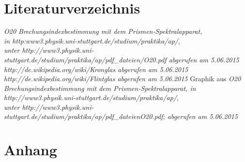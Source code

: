 \documentclass[fontsize=12pt]{scrartcl}
\begin{document}
\newpage
\section{Literaturverzeichnis}

\renewcommand{\refname}{~}
\vspace{-30pt}
\begin{thebibliography}{xxxxxxxx}
			\textit{\glqq O20 Brechungsindexbestimmung mit dem Prismen-Spektralapparat\grqq , \\
								 in http:www3.physik.uni-stuttgart.de/studium/praktika/ap/},\\
								\textit{ unter http://www3.physik.uni-stuttgart.de/studium/praktika/ap/pdf\_dateien/O20.pdf abgerufen am 5.06.2015}
			\textit{	http://de.wikipedia.org/wiki/Kronglas abgerufen am 5.06.2015}
			\textit{	http://de.wikipedia.org/wiki/Flintglas abgerufen am 5.06.2015}
     	Graphik aus \textit{\glqq O20 Brechungsindexbestimmung mit dem Prismen-Spektralapparat\grqq , in 	\\
   								http://www3.physik.uni-stuttgart.de/studium/praktika/ap/}, \\
   								\textit{ unter 	http://www3.physik.uni-stuttgart.de/studium/praktika/ap/pdf\_dateienO20.pdf; abgerufen am 5.06.2015} 

\end{thebibliography}

\section{Anhang}
\end{document}
